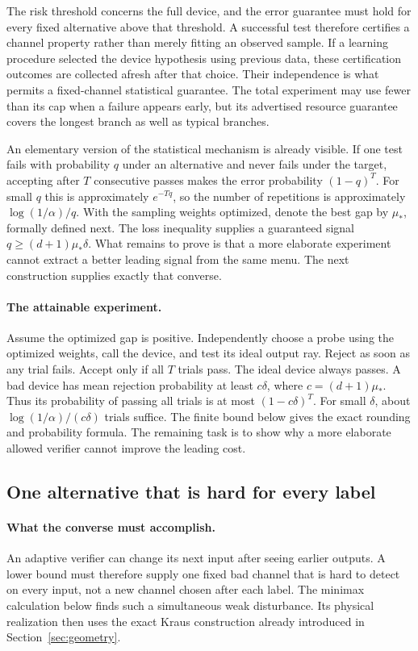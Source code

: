 \documentclass[11pt,a4paper]{article}
\numberwithin{equation}{section}
\begin{document}
The risk threshold concerns the full device, and the error guarantee must
hold for every fixed alternative above that threshold.  A successful test
therefore certifies a channel property rather than merely fitting an
observed sample.  If a learning procedure selected the device hypothesis
using previous data, these certification outcomes are collected afresh
after that choice.  Their independence is what permits a fixed-channel
statistical guarantee.  The total experiment may use fewer than its cap
when a failure appears early, but its advertised resource guarantee covers
the longest branch as well as typical branches.

An elementary version of the statistical mechanism is already visible.
If one test fails with probability $q$ under an alternative and never fails
under the target, accepting after $T$ consecutive passes makes the error
probability $(1-q)^T$.  For small $q$ this is approximately $e^{-Tq}$, so
the number of repetitions is approximately $\log(1/\alpha)/q$.  With the sampling weights optimized, denote the best gap by $\mu_*$, formally defined next. The loss
inequality supplies a guaranteed signal $q\geq(d+1)\mu_*\delta$.  What
remains to prove is that a more elaborate experiment cannot extract a
better leading signal from the same menu.  The next construction supplies
exactly that converse.

\paragraph{The attainable experiment.}
Assume the optimized gap is positive. Independently choose a probe using
the optimized weights, call the device, and test its ideal output ray.
Reject as soon as any trial fails. Accept only if all $T$ trials pass.
The ideal device always passes. A bad device has mean rejection probability
at least $c\delta$, where $c=(d+1)\mu_*$. Thus its probability of passing
all trials is at most $(1-c\delta)^T$. For small $\delta$, about
$\log(1/\alpha)/(c\delta)$ trials suffice. The finite bound below gives
the exact rounding and probability formula. The remaining task is to show
why a more elaborate allowed verifier cannot improve the leading cost.

\subsection{One alternative that is hard for every label}

\paragraph{What the converse must accomplish.}
An adaptive verifier can change its next input after seeing earlier outputs.
A lower bound must therefore supply one fixed bad channel that is hard to
detect on every input, not a new channel chosen after each label. The
minimax calculation below finds such a simultaneous weak disturbance.
Its physical realization then uses the exact Kraus construction already
introduced in Section~\ref{sec:geometry}.
\end{document}
